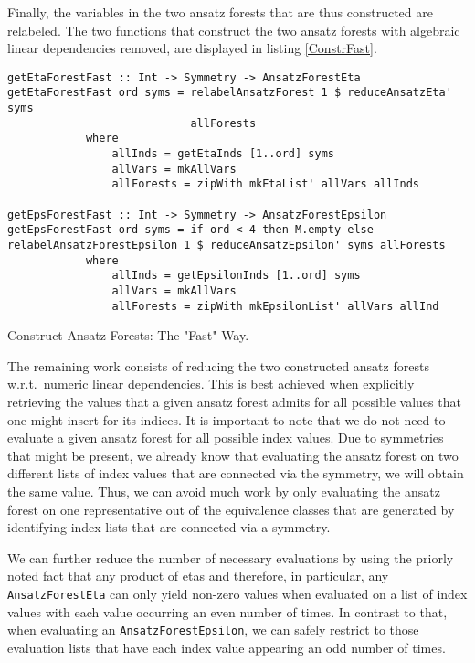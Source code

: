 Finally, the variables in the two ansatz forests that are thus constructed are relabeled. The two functions that construct the two ansatz forests with algebraic linear dependencies removed, are displayed in listing \ref{ConstrFast}.
\begin{listing}[hbt!]
\begin{verbatim}
getEtaForestFast :: Int -> Symmetry -> AnsatzForestEta
getEtaForestFast ord syms = relabelAnsatzForest 1 $ reduceAnsatzEta' syms 
                            allForests
            where
                allInds = getEtaInds [1..ord] syms
                allVars = mkAllVars
                allForests = zipWith mkEtaList' allVars allInds

getEpsForestFast :: Int -> Symmetry -> AnsatzForestEpsilon
getEpsForestFast ord syms = if ord < 4 then M.empty else
relabelAnsatzForestEpsilon 1 $ reduceAnsatzEpsilon' syms allForests
            where
                allInds = getEpsilonInds [1..ord] syms
                allVars = mkAllVars
                allForests = zipWith mkEpsilonList' allVars allInd
\end{verbatim} 
\caption{Construct Ansatz Forests: The "Fast" Way.}\label{ConstrFast}
\end{listing}

The remaining work consists of reducing the two constructed ansatz forests w.r.t.\ numeric linear dependencies. This is best achieved when explicitly retrieving the values that a given ansatz forest admits for all possible values that one might insert for its indices. It is important to note that we do not need to evaluate a given ansatz forest for all possible index values.
Due to symmetries that might be present, we already know that evaluating the ansatz forest on two different lists of index values that are connected via the symmetry, we will obtain the same value. Thus, we can avoid much work by only evaluating the ansatz forest on one representative out of the equivalence classes that are generated by identifying index lists that are connected via a symmetry. 

We can further reduce the number of necessary evaluations by using the priorly noted fact that any product of etas and therefore, in particular, any \texttt{AnsatzForestEta} can only yield non-zero values when evaluated on a list of index values with each value occurring an even number of times. In contrast to that, when evaluating an \texttt{AnsatzForestEpsilon}, we can safely restrict to those evaluation lists that have each index value appearing an odd number of times.

